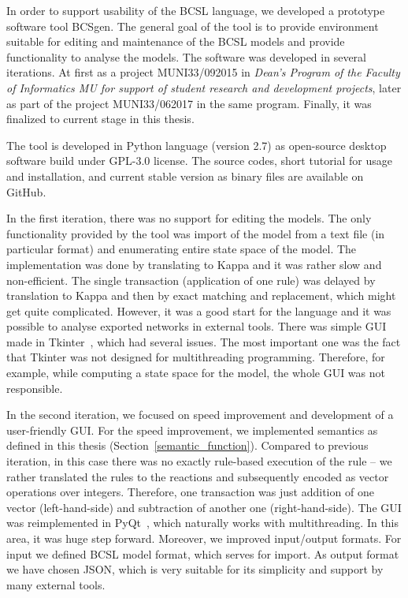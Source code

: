 \documentclass[12pt]{fithesis2}
\begin{document}
In order to support usability of the BCSL language, we developed a prototype software tool BCSgen. The general goal of the tool is to provide environment suitable for editing and maintenance of the BCSL models and provide functionality to analyse the models. The software was developed in several iterations. At first as a project MUNI33/092015 in \emph{Dean's Program of the Faculty of Informatics MU for support of student research and development projects}, later as part of the project MUNI33/062017 in the same program. Finally, it was finalized to current stage in this thesis.

The tool is developed in Python language (version 2.7) as open-source desktop software build under GPL-3.0 license. The source codes, short tutorial for usage and installation, and current stable version as binary files are available on GitHub\footnotemark[1].

In the first iteration, there was no support for editing the models. The only functionality provided by the tool was import of the model from a text file (in particular format) and enumerating entire state space of the model. The implementation was done by translating to Kappa and it was rather slow and non-efficient. The single transaction (application of one rule) was delayed by translation to Kappa and then by exact matching and replacement, which might get quite complicated. However, it was a good start for the language and it was possible to analyse exported networks in external tools. There was simple GUI made in Tkinter~\cite{Tkinter}, which had several issues. The most important one was the fact that Tkinter was not designed for multithreading programming. Therefore, for example, while computing a state space for the model, the whole GUI was not responsible.

In the second iteration, we focused on speed improvement and development of a user-friendly GUI. For the speed improvement, we implemented semantics as defined in this thesis (Section~\ref{semantic_function}). Compared to previous iteration, in this case there was no exactly rule-based execution of the rule -- we rather translated the rules to the reactions and subsequently encoded as vector operations over integers. Therefore, one transaction was just addition of one vector (left-hand-side) and subtraction of another one (right-hand-side). The GUI was reimplemented in PyQt~\cite{summerfield2007rapid}, which naturally works with multithreading. In this area, it was huge step forward. Moreover, we improved input/output formats. For input we defined BCSL model format, which serves for import. As output format we have chosen JSON, which is very suitable for its simplicity and support by many external tools.
\end{document}
